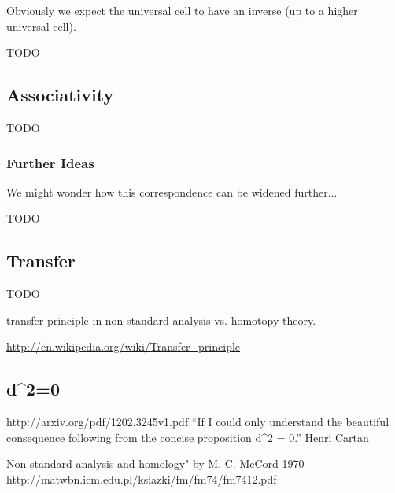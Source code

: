 \documentclass{article}
\begin{document}
Obviously we expect the universal cell to have an inverse (up to a higher universal cell).

TODO

\subsection{Associativity}

TODO

\subsubsection{Further Ideas}

We might wonder how this correspondence can be widened further...

TODO

\subsection{Transfer}

TODO

transfer principle in non-standard analysis vs. homotopy theory.

\url{http://en.wikipedia.org/wiki/Transfer_principle}

\subsection{d^2=0}
http://arxiv.org/pdf/1202.3245v1.pdf
“If I could only understand the beautiful consequence following from the concise proposition d^2 = 0.” Henri Cartan

Non-standard analysis and homology" by M. C. McCord 1970
http://matwbn.icm.edu.pl/ksiazki/fm/fm74/fm7412.pdf
\end{document}
